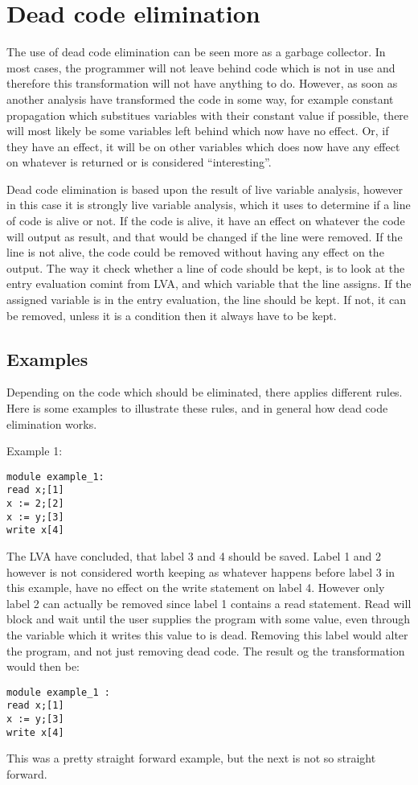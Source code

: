 \section{Dead code elimination}
The use of dead code elimination can be seen more as a garbage collector. In most cases, the programmer will not leave behind code which is not in use and therefore this transformation will not have anything to do. However, as soon as another analysis have transformed the code in some way, for example constant propagation which substitues variables with their constant value if possible, there will most likely be some variables left behind which now have no effect. Or, if they have an effect, it will be on other variables which does now have any effect on whatever is returned or is considered ``interesting''.

Dead code elimination is based upon the result of live variable analysis, however in this case it is strongly live variable analysis, which it uses to determine if a line of code is alive or not. If the code is alive, it have an effect on whatever the code will output as result, and that would be changed if the line were removed. If the line is not alive, the code could be removed without having any effect on the output. The way it check whether a line of code should be kept, is to look at the entry evaluation comint from LVA, and which variable that the line assigns. If the assigned variable is in the entry evaluation, the line should be kept. If not, it can be removed, unless it is a condition then it always have to be kept.

\subsection{Examples}
Depending on the code which should be eliminated, there applies different rules. Here is some examples to illustrate these rules, and in general how dead code elimination works.

\docpar
Example 1:
\begin{lstlisting}
module example_1:
read x;[1]
x := 2;[2]
x := y;[3]
write x[4]
\end{lstlisting}
The LVA have concluded, that label 3 and 4 should be saved. Label 1 and 2 however is not considered worth keeping as whatever happens before label 3 in this example, have no effect on the write statement on label 4. However only label 2 can actually be removed since label 1 contains a read statement. Read will block and wait until the user supplies the program with some value, even through the variable which it writes this value to is dead. Removing this label would alter the program, and not just removing dead code. The result og the transformation would then be:
\begin{lstlisting}
module example_1 :
read x;[1]
x := y;[3]
write x[4]
\end{lstlisting}
This was a pretty straight forward example, but the next is not so straight forward.

